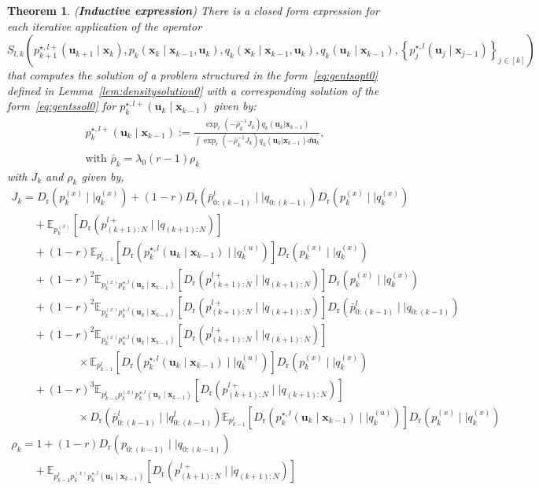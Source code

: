 \documentclass[10pt,a4paper]{amsart}
\newtheorem{theorem}{Theorem}
\newcommand{\Dr}[2]{{D}_{\text{r}}\left(#1\mid \mid #2 \right)}
\newcommand{\E}{\mathbb{E}}
\newcommand{\bv}[1]{\mathbf{#1}}
\newcommand{\optimalpolicygen}[3]{p^{\star,{#3}}_{{#1}} \left(\bv{u}_{{#1}}\mid \bv{x}_{{#2}} \right)}
\newcommand{\plant}[2]{p_{{#1}} \left(\bv{x}_{{#1}}\mid \bv{x}_{{#2}}, \bv{u}_{{#1}} \right)}
\newcommand{\refplant}[2]{q_{{#1}} \left(\bv{x}_{{#1}}\mid \bv{x}_{{#2}}, \bv{u}_{{#1}} \right)}
\newcommand{\refpolicy}[2]{q_{{#1}}\left(\bv{u}_{{#1}}\mid \bv{x}_{{#2}} \right)}
\newcommand{\shortplant}[1]{p_{{#1}}^{(x)}}
\begin{document}
\begin{theorem}\label{th:solnonefp} ({\bf Inductive expression})
There is a closed form expression for each iterative application of the operator \[
S_{l,k}\left(\optimalpolicygen{k+1}{k}{l+} ,\plant{k}{k-1},\refplant{k}{k-1},\refpolicy{k}{k-1},\left\{\optimalpolicygen{j}{j-1}{l}\right\}_{j\in[k]}\right)
\]
that computes the solution of a problem structured in the form~\eqref{eq:gentsopt0} defined in Lemma~\ref{lem:densitysolution0} with a corresponding solution of the form~\eqref{eq:gentssol0} for $\optimalpolicygen{k}{k-1}{l+}$ given by:
\begin{equation}\label{eq:backfpsolkthm}
    \begin{array}{l}
        \optimalpolicygen{k}{k-1}{l+}:= \frac{\exp_r\left(-\bar{\rho}_k^{-1}J_k \right)q_k(\bv{u}_k\vert \bv{x}_{k-1})}{\int \exp_r\left(-\bar{\rho}_k^{-1}J_k \right)q_k(\bv{u}_k\vert \bv{x}_{k-1}) d\bv{u}_k},\\
        \text{with } \bar{\rho}_k = \lambda_0(r-1)\rho_k
        \end{array}
    \end{equation}
    with $J_k$ and $\rho_k$ given by,
\begin{equation}\label{eq:backfpsolktermsthm}
\begin{array}{l}
J_k=\Dr{\shortplant{k}}{q^{(x)}_k}+(1-r) \Dr{\bar{p}^{l}_{0:(k-1)}}{q_{0:(k-1)}}\Dr{\shortplant{k}}{q^{(x)}_k} \\ 
\qquad+\E_{\shortplant{k}}\left[\Dr{p^{l+}_{(k+1):N}}{q_{(k+1):N}}\right]
 \\ \qquad +(1-r)\E_{p^l_{k-1}}\left[\Dr{\optimalpolicygen{k}{k-1}{l}}{q^{(u)}_k}\right]\Dr{\shortplant{k}}{q^{(x)}_k}\\ \qquad +
(1-r)^2\E_{\shortplant{k}\optimalpolicygen{k}{k-1}{l}}\left[\Dr{p^{l+}_{(k+1):N}}{q_{(k+1):N}}\right] \Dr{\shortplant{k}}{q^{(x)}_k} \\
\qquad +(1-r)^2\E_{\shortplant{k}\optimalpolicygen{k}{k-1}{l}}\left[\Dr{p^{l+}_{(k+1):N}}{q_{(k+1):N}}\right] \Dr{\bar{p}^{l}_{0:(k-1)}}{q_{0:(k-1)}}\\
\qquad +(1-r)^2 \E_{\shortplant{k}\optimalpolicygen{k}{k-1}{l}}\left[\Dr{p^{l+}_{(k+1):N}}{q_{(k+1):N}}\right] \\ \qquad\qquad\qquad\times\E_{p^l_{k-1}}\left[\Dr{\optimalpolicygen{k}{k-1}{l}}{q^{(u)}_k}\right]\Dr{\shortplant{k}}{q^{(x)}_k} \\
\qquad + (1-r)^3\E_{p^l_{k-1}\shortplant{k}\optimalpolicygen{k}{k-1}{l}}\left[\Dr{p^{l+}_{(k+1):N}}{q_{(k+1):N}}\right]\\ \qquad\qquad\qquad\times \Dr{\bar{p}^l_{0:(k-1)}}{q^l_{0:(k-1)}}\E_{p^l_{k-1}}\left[\Dr{\optimalpolicygen{k}{k-1}{l}}{q^{(u)}_k}\right]\Dr{\shortplant{k}}{q^{(x)}_k}
\\
\rho_k = 1+(1-r)\Dr{p_{0:(k-1)}}{q_{0:(k-1)}}\\
\qquad+\E_{p^l_{k-1}\shortplant{k}\optimalpolicygen{k}{k-1}{l}}\left[\Dr{p^{l+}_{(k+1):N}}{q_{(k+1):N}}\right]
\end{array}
\end{equation}
\end{theorem}
\end{document}
